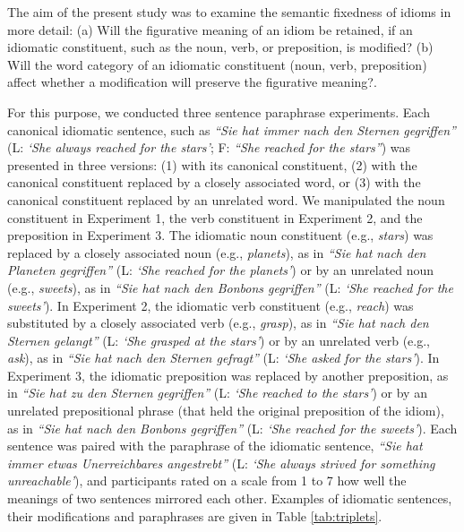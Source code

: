 The aim of the present study was to examine the semantic fixedness of idioms in more detail: (a) Will the figurative meaning of an idiom be retained, if an idiomatic constituent, such as the noun, verb, or preposition, is modified?  (b) Will the word category of an idiomatic constituent (noun, verb, preposition) affect whether a modification will preserve the figurative meaning?. 

For this purpose, we conducted three sentence paraphrase experiments. Each canonical idiomatic sentence, such as \textit{``Sie hat immer nach den Sternen gegriffen''} (L: \textit{‘She always reached for the stars’}; F: \textit{``She reached for the stars''}) was presented in three versions: (1) with its canonical constituent, (2) with the canonical constituent replaced by a closely associated word, or (3) with the canonical constituent replaced by an unrelated word. We manipulated the noun constituent in Experiment 1, the verb constituent in Experiment 2, and the preposition in Experiment 3. The idiomatic noun constituent (e.g., \textit{stars}) was replaced by a closely associated noun (e.g., \textit{planets}), as in \textit{``Sie hat nach den Planeten gegriffen''} (L: \textit{‘She reached for the planets’}) or by an unrelated noun (e.g., \textit{sweets}), as in \textit{``Sie hat nach den Bonbons gegriffen''} (L: \textit{‘She reached for the sweets’}). In Experiment 2, the idiomatic verb constituent (e.g., \textit{reach}) was substituted by a closely associated verb (e.g., \textit{grasp}), as in \textit{``Sie hat nach den Sternen gelangt''} (L: \textit{‘She grasped at the stars’}) or by an unrelated verb (e.g., \textit{ask}), as in \textit{``Sie hat nach den Sternen gefragt''} (L: \textit{‘She asked for the stars’}). In Experiment 3, the idiomatic preposition was replaced by another preposition, as in \textit{``Sie hat zu den Sternen gegriffen''} (L: \textit{‘She reached to the stars’}) or by an unrelated prepositional phrase (that held the original preposition of the idiom), as in \textit{``Sie hat nach den Bonbons gegriffen''} (L: \textit{‘She reached for the sweets’}).  Each sentence was paired with the paraphrase of the idiomatic sentence, \textit{``Sie hat immer etwas Unerreichbares angestrebt''} (L: \textit{‘She always strived for something unreachable’}), and participants rated on a scale from 1 to 7 how well the meanings of two sentences mirrored each other. Examples of idiomatic sentences, their modifications and paraphrases are given in Table \ref{tab:triplets}.

